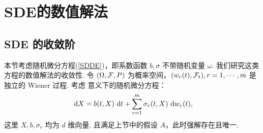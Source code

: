\chapter{SDE的数值解法}\label{chap3}

\section{SDE 的收敛阶}

本节考虑随机微分方程(\ref{SDDE})，即系数函数 $b,\sigma$ 不带随机变量 $\omega$. 我们研究这类方程的数值解法的收敛性. 令 $(\Omega,\mathcal{F},P)$ 为概率空间，$(w_r(t),\mathcal{F}_t),r=1,\cdots,m$ 是独立的 Wiener 过程. 考虑 \ito 意义下的随机微分方程：
\begin{equation}\label{eq3.1}
	\text{ d} X=b(t,X) \text{ d} t+\sum_{r=1}^m \sigma_r(t,X) \text{ d} w_r(t),
\end{equation}
这里 $X,b,\sigma_r$ 均为 $d$ 维向量. 且满足上节中的假设 $A$，此时强解存在且唯一. 

